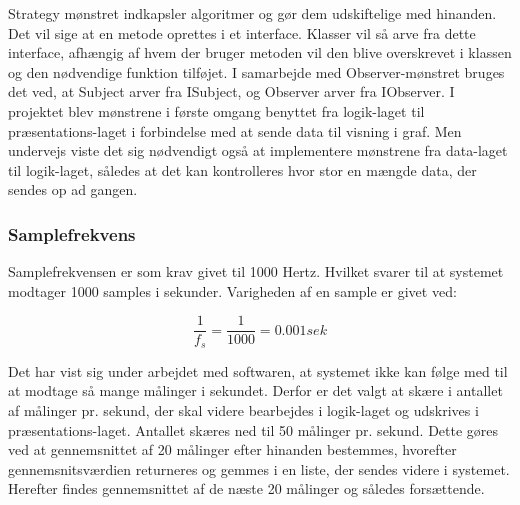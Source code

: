 Strategy mønstret indkapsler algoritmer og gør dem udskiftelige med hinanden. Det vil sige at en metode oprettes i et interface. Klasser vil så arve fra dette interface, afhængig af hvem der bruger metoden vil den blive overskrevet i klassen og den nødvendige funktion tilføjet. I samarbejde med Observer-mønstret bruges det ved, at Subject arver fra ISubject, og Observer arver fra IObserver. 
I projektet blev mønstrene i første omgang benyttet fra logik-laget til præsentations-laget i forbindelse med at sende data til visning i graf. Men undervejs viste det sig nødvendigt også at implementere mønstrene fra data-laget til logik-laget, således at det kan kontrolleres hvor stor en mængde data, der sendes op ad gangen. 

\subsubsection{Samplefrekvens}
Samplefrekvensen er som krav givet til 1000 Hertz. Hvilket svarer til at systemet modtager 1000 samples i sekunder. Varigheden af en sample er givet ved: 
\begin{ceqn}
\begin{equation}
\frac{1}{f_s}=\frac{1}{1000}=0.001 sek
\end{equation}
\end{ceqn}
Det har vist sig under arbejdet med softwaren, at systemet ikke kan følge med til at modtage så mange målinger i sekundet. Derfor er det valgt at skære i antallet af målinger pr. sekund, der skal videre bearbejdes i logik-laget og udskrives i præsentations-laget. Antallet skæres ned til 50 målinger pr. sekund. Dette gøres ved at gennemsnittet af 20 målinger efter hinanden bestemmes, hvorefter gennemsnitsværdien returneres og gemmes i en liste, der sendes videre i systemet. Herefter findes gennemsnittet af de næste 20 målinger og således forsættende.   

